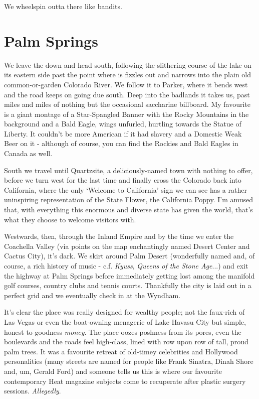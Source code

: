 \documentclass[a5paper,titlepage,draft]{book}
\begin{document}
We wheelspin outta there like bandits.

\section*{Palm Springs}
We leave the down and head south, following the slithering course of the lake on its eastern side past the point where is fizzles out and narrows into the plain old common-or-garden Colorado River.  We follow it to Parker, where it bends west and the road keeps on going due south.  Deep into the badlands it takes us, past miles and miles of nothing but the occasional saccharine billboard.  My favourite is a giant montage of a Star-Spangled Banner with the Rocky Mountains in the background and a Bald Eagle, wings unfurled, hurtling towards the Statue of Liberty.  It couldn't be more American if it had slavery and a Domestic Weak Beer on it - although of course, you can find the Rockies and Bald Eagles in Canada as well.

South we travel until Quartzsite, a deliciously-named town with nothing to offer, before we turn west for the last time and finally cross the Colorado back into California, where the only `Welcome to California' sign we can see has a rather uninspiring representation of the State Flower, the California Poppy.  I'm amused that, with everything this enormous and diverse state has given the world, that's what they choose to welcome visitors with.

Westwards, then, through the Inland Empire and by the time we enter the Coachella Valley (via points on the map enchantingly named Desert Center and Cactus City), it's dark.  We skirt around Palm Desert (wonderfully named and, of course, a rich history of music - c.f. \emph{Kyuss}, \emph{Queens of the Stone Age}...) and exit the highway at Palm Springs before immediately getting lost among the manifold golf courses, country clubs and tennis courts.  Thankfully the city is laid out in a perfect grid and we eventually check in at the Wyndham.

It's clear the place was really designed for wealthy people; not the faux-rich of Las Vegas or even the boat-owning menagerie of Lake Havasu City but simple, honest-to-goodness \emph{money}.  The place oozes poshness from its pores, even the boulevards and the roads feel high-class, lined with row upon row of tall, proud palm trees.  It was a favourite retreat of old-timey celebrities and Hollywood personalities (many streets are named for people like Frank Sinatra, Dinah Shore and, um, Gerald Ford) and someone tells us this is where our favourite contemporary Heat magazine subjects come to recuperate after plastic surgery sessions.  \emph{Allegedly}.
\end{document}
